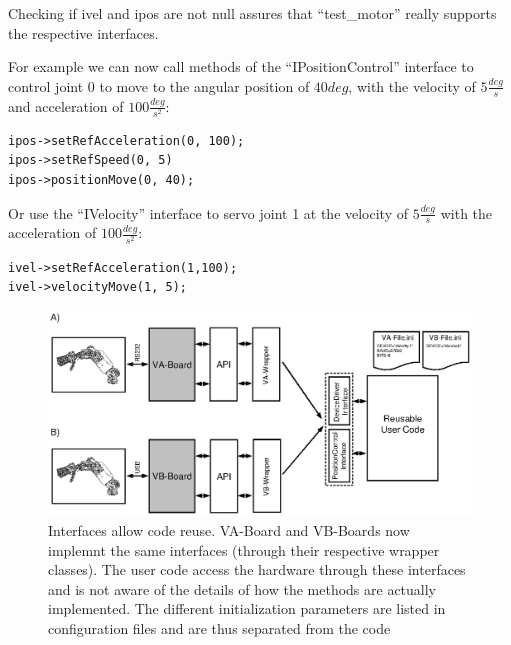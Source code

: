 Checking if ivel and ipos are not null assures that ``test\_motor'' really supports
the respective interfaces.

For example we can now call methods of the ``IPositionControl'' interface to control 
joint $0$ to move to the angular position of $40deg$, with the velocity of $5\frac{deg}{s}$ and acceleration of $100\frac{deg}{s^2}$:

\begin{verbatim}
ipos->setRefAcceleration(0, 100);
ipos->setRefSpeed(0, 5)
ipos->positionMove(0, 40);
\end{verbatim}

Or use the ``IVelocity'' interface to servo joint 1 at the velocity of 
$5\frac{deg}{s}$ with the acceleration of $100\frac{deg}{s^2}$:

\begin{verbatim}
ivel->setRefAcceleration(1,100);
ivel->velocityMove(1, 5);
\end{verbatim}

\begin{figure}[tbp]
\centerline{
\includegraphics[width=24cm]{fig-devices2.eps}
}
\caption{Interfaces allow code reuse. VA-Board and VB-Boards now implemnt
the same interfaces (through their respective wrapper classes). The user 
code access the hardware through these interfaces and is not aware of 
the details of how the methods are actually implemented. The different 
initialization parameters are listed in configuration files and are thus 
separated from the code}\label{fig:devices2}
\end{figure}

